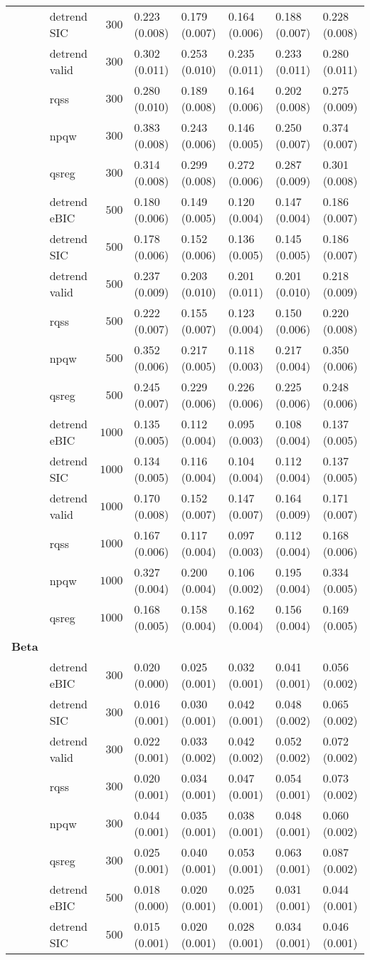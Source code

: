 \begin{table}[!tbp]
\begin{center}
\begin{tabular}{llrlllll}
~~&detrend SIC&$ 300$&0.223 (0.008)&0.179 (0.007)&0.164 (0.006)&0.188 (0.007)&0.228 (0.008)\tabularnewline
~~&detrend valid&$ 300$&0.302 (0.011)&0.253 (0.010)&0.235 (0.011)&0.233 (0.011)&0.280 (0.011)\tabularnewline
~~&rqss&$ 300$&0.280 (0.010)&0.189 (0.008)&0.164 (0.006)&0.202 (0.008)&0.275 (0.009)\tabularnewline
~~&npqw&$ 300$&0.383 (0.008)&0.243 (0.006)&0.146 (0.005)&0.250 (0.007)&0.374 (0.007)\tabularnewline
~~&qsreg&$ 300$&0.314 (0.008)&0.299 (0.008)&0.272 (0.006)&0.287 (0.009)&0.301 (0.008)\tabularnewline
~~&detrend eBIC&$ 500$&0.180 (0.006)&0.149 (0.005)&0.120 (0.004)&0.147 (0.004)&0.186 (0.007)\tabularnewline
~~&detrend SIC&$ 500$&0.178 (0.006)&0.152 (0.006)&0.136 (0.005)&0.145 (0.005)&0.186 (0.007)\tabularnewline
~~&detrend valid&$ 500$&0.237 (0.009)&0.203 (0.010)&0.201 (0.011)&0.201 (0.010)&0.218 (0.009)\tabularnewline
~~&rqss&$ 500$&0.222 (0.007)&0.155 (0.007)&0.123 (0.004)&0.150 (0.006)&0.220 (0.008)\tabularnewline
~~&npqw&$ 500$&0.352 (0.006)&0.217 (0.005)&0.118 (0.003)&0.217 (0.004)&0.350 (0.006)\tabularnewline
~~&qsreg&$ 500$&0.245 (0.007)&0.229 (0.006)&0.226 (0.006)&0.225 (0.006)&0.248 (0.006)\tabularnewline
~~&detrend eBIC&$1000$&0.135 (0.005)&0.112 (0.004)&0.095 (0.003)&0.108 (0.004)&0.137 (0.005)\tabularnewline
~~&detrend SIC&$1000$&0.134 (0.005)&0.116 (0.004)&0.104 (0.004)&0.112 (0.004)&0.137 (0.005)\tabularnewline
~~&detrend valid&$1000$&0.170 (0.008)&0.152 (0.007)&0.147 (0.007)&0.164 (0.009)&0.171 (0.007)\tabularnewline
~~&rqss&$1000$&0.167 (0.006)&0.117 (0.004)&0.097 (0.003)&0.112 (0.004)&0.168 (0.006)\tabularnewline
~~&npqw&$1000$&0.327 (0.004)&0.200 (0.004)&0.106 (0.002)&0.195 (0.004)&0.334 (0.005)\tabularnewline
~~&qsreg&$1000$&0.168 (0.005)&0.158 (0.004)&0.162 (0.004)&0.156 (0.004)&0.169 (0.005)\tabularnewline
\hline
{\bfseries Beta}&&&&&&&\tabularnewline
~~&detrend eBIC&$ 300$&0.020 (0.000)&0.025 (0.001)&0.032 (0.001)&0.041 (0.001)&0.056 (0.002)\tabularnewline
~~&detrend SIC&$ 300$&0.016 (0.001)&0.030 (0.001)&0.042 (0.001)&0.048 (0.002)&0.065 (0.002)\tabularnewline
~~&detrend valid&$ 300$&0.022 (0.001)&0.033 (0.002)&0.042 (0.002)&0.052 (0.002)&0.072 (0.002)\tabularnewline
~~&rqss&$ 300$&0.020 (0.001)&0.034 (0.001)&0.047 (0.001)&0.054 (0.001)&0.073 (0.002)\tabularnewline
~~&npqw&$ 300$&0.044 (0.001)&0.035 (0.001)&0.038 (0.001)&0.048 (0.001)&0.060 (0.002)\tabularnewline
~~&qsreg&$ 300$&0.025 (0.001)&0.040 (0.001)&0.053 (0.001)&0.063 (0.001)&0.087 (0.002)\tabularnewline
~~&detrend eBIC&$ 500$&0.018 (0.000)&0.020 (0.001)&0.025 (0.001)&0.031 (0.001)&0.044 (0.001)\tabularnewline
~~&detrend SIC&$ 500$&0.015 (0.001)&0.020 (0.001)&0.028 (0.001)&0.034 (0.001)&0.046 (0.001)\tabularnewline

\end{tabular}
\end{center}
\end{table}
